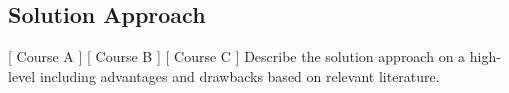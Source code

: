 \subsection{Solution Approach}
[ Course A ] [ Course B ] [ Course C ] 
\newline
Describe the solution approach on a high-level including advantages and drawbacks based on relevant literature.
